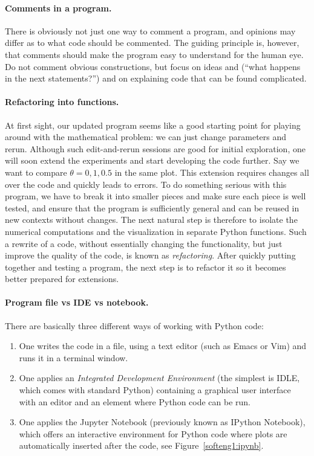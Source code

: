 \documentclass[%
oneside,                 %
final,                   %
10pt]{article}
\begin{document}
\paragraph{Comments in a program.}
There is obviously not just one way to comment a program, and opinions
may differ as to what code should be commented.
The guiding principle is, however, that comments should make the
program easy to understand for the human eye. Do not comment obvious
constructions, but focus on ideas and (``what happens in the next
statements?'') and on explaining code that can be found
complicated.



\paragraph{Refactoring into functions.}
At first sight, our updated program seems like
a good starting point for playing around
with the mathematical problem: we can just change parameters and rerun.
Although such edit-and-rerun sessions are good for initial exploration,
one will soon extend the experiments and start developing the code
further. Say we want to compare $\theta =0,1,0.5$ in the same
plot. This extension requires changes all over the code and quickly
leads to errors. To do something serious with this program, we have to
break it into smaller pieces and make sure each piece is well tested,
and ensure that the program is sufficiently general and can be reused in
new contexts without changes.  The
next natural step is therefore to isolate the numerical computations
and the visualization in separate Python functions.
Such a rewrite of a code, without essentially changing the functionality,
but just improve the quality of the code, is known as \emph{refactoring}.
After quickly putting together and testing a program, the next
step is to refactor it so it becomes better prepared for extensions.

\paragraph{Program file vs IDE vs notebook.}
There are basically three different ways of working with Python code:

\begin{enumerate}
\item One writes the code in a file, using a text editor (such as
   Emacs or Vim) and runs it in a terminal window.

\item One applies an \emph{Integrated Development Environment} (the simplest is IDLE, which comes with standard Python) containing a graphical user interface with an editor and an element where Python code can be run.

\item One applies the Jupyter Notebook (previously known as IPython Notebook),
   which offers an interactive environment for Python code where
   plots are automatically inserted after the code, see Figure~\ref{softeng1:ipynb}.
\end{enumerate}
\end{document}
